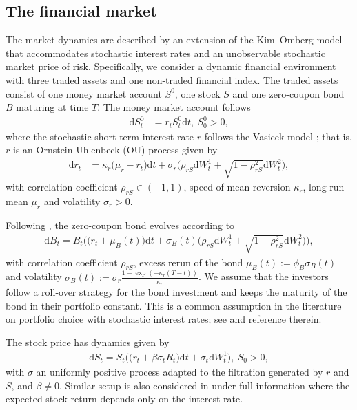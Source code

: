 \documentclass[12,reqno]{amsart}
\numberwithin{equation}{section}
\begin{document}
\subsection{The financial market}\label{The financial market}
The market dynamics are described by an extension of the Kim--Omberg model \cite{kim1996dynamic} that accommodates stochastic interest rates and an unobservable stochastic market price of risk. Specifically, we consider a dynamic financial environment with three traded assets and one non-traded financial index. The traded assets consist of one money market account $S^{0}$, one stock $S$ and one zero-coupon bond $B$ maturing at time $T$. The money market account follows
\begin{align}\label{Money market account}
	\mathrm{d}S_{t}^{0}&=r_{t}S_{t}^{0}\mathrm{d}t,~S_{0}^{0}>0,
\end{align}
where the stochastic short-term interest rate $r$ follows the Vasicek model \cite{vasicek1977equilibrium}; that is, $r$ is an Ornstein-Uhlenbeck (OU) process given by
\begin{align}\label{Stochastic interest rate}
	\mathrm{d}r_{t}&=\kappa_{r}\big(\mu_{r}-r_{t}\big)\mathrm{d}t+\sigma_{r}\Big(\rho_{rS}\mathrm{d}W_{t}^{1}+\sqrt{1-\rho_{rS}^{2}}\mathrm{d}W_{t}^{2}\Big),
\end{align}
with correlation coefficient $\rho_{rS}\in(-1,1)$, speed of mean reversion $\kappa_{r}$, long run mean $\mu_{r}$ and volatility $\sigma_{r}>0$.

Following \cite{vasicek1977equilibrium}, the zero-coupon bond evolves according to
\begin{align}\label{Zero-coupon bond}
	\mathrm{d}B_{t}=B_{t}\Big(\big(r_{t}+\mu_{B}(t)\big)\mathrm{d}t+\sigma_{B}(t)\Big(\rho_{rS}\mathrm{d}W_{t}^{1}+\sqrt{1-\rho_{rS}^{2}}\mathrm{d}W_{t}^{2}\Big)\Big),
\end{align}
with correlation coefficient $\rho_{rS}$, excess rerun of the bond $\mu_{B}(t):=\phi_{B}\sigma_{B}(t)$ and volatility $\sigma_{B}(t):=\sigma_{r}\frac{1-\exp(-\kappa_{r}(T-t))}{\kappa_{r}}$. We assume that the investors follow a roll-over strategy for the bond investment and keeps the maturity of the bond in their portfolio constant. This is a common assumption in the literature on portfolio choice with stochastic interest rates; see \cite{escobar2016portfolio} and reference therein.

The stock price has dynamics given by
\begin{align}\label{Stock}
	\mathrm{d}S_{t}=S_{t}\Big(\big(r_{t}+\beta\sigma_{t}R_{t}\big)\mathrm{d}t+\sigma_{t}\mathrm{d}W_{t}^{1}\Big),~S_{0}>0,
\end{align}
with $\sigma$ an uniformly positive process adapted to the filtration generated by $r$ and $S$, and $\beta\ne0$. Similar setup is also considered in \cite{detemple2003monte} under full information where the expected stock return depends only on the interest rate.
\end{document}
